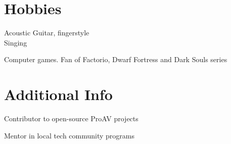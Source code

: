 \documentclass[]{private}
\begin{document}
\begin{paracol}{2}
    \section{Hobbies} 
    \textbullet{} Acoustic Guitar, fingerstyle \\
    \textbullet{} Singing \\
    \begin{hangingpar}
        \textbullet{} Computer games. Fan of Factorio, Dwarf Fortress and Dark Souls series
    \end{hangingpar}
    \sectionsep
    
    
    \section{Additional Info}
    \begin{hangingpar}
        \textbullet{} Contributor to open-source ProAV projects \\
    \end{hangingpar}
    \begin{hangingpar}
        \textbullet{} Mentor in local tech community programs
    \end{hangingpar}
\end{paracol}
\end{document}
